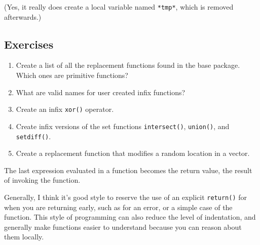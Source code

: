 (Yes, it really does create a local variable named \texttt{*tmp*}, which
is removed afterwards.)

\subsection{Exercises}

\begin{enumerate}
\def\labelenumi{\arabic{enumi}.}
\item
  Create a list of all the replacement functions found in the base
  package. Which ones are primitive functions?
\item
  What are valid names for user created infix functions?
\item
  Create an infix \texttt{xor()} operator.
\item
  Create infix versions of the set functions \texttt{intersect()},
  \texttt{union()}, and \texttt{setdiff()}.
\item
  Create a replacement function that modifies a random location in a
  vector.
\end{enumerate}


The last expression evaluated in a function becomes the return value,
the result of invoking the function. 

\begin{Shaded}
\begin{Highlighting}[]
\StringTok{ }
  \StringTok{ }\NormalTok{) \{}
  \NormalTok{\}}
\NormalTok{\}}
\NormalTok{(}\NormalTok{)}
\NormalTok{(}\NormalTok{)}
\end{Highlighting}
\end{Shaded}

Generally, I think it's good style to reserve the use of an explicit
\texttt{return()} for when you are returning early, such as for an
error, or a simple case of the function. This style of programming can
also reduce the level of indentation, and generally make functions
easier to understand because you can reason about them locally.

